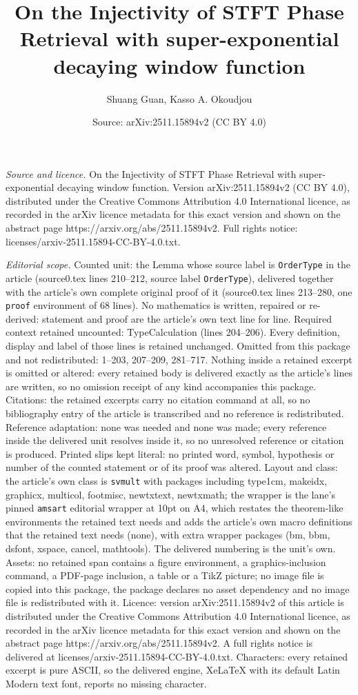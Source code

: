 \documentclass[10pt,a4paper]{amsart}
\title[On the Injectivity of STFT Phase Retrieval with super-expone]{On the Injectivity of STFT Phase Retrieval with super-exponential decaying window function}
\author{Shuang Guan, Kasso A. Okoudjou}
\date{Source: arXiv:2511.15894v2 (CC BY 4.0)}
\begin{document}
\maketitle

\noindent\emph{Source and licence.} On the Injectivity of STFT Phase Retrieval with super-exponential decaying window function. Version arXiv:2511.15894v2 (CC BY 4.0), distributed under the Creative Commons Attribution 4.0 International licence, as recorded in the arXiv licence metadata for this exact version and shown on the abstract page https://arxiv.org/abs/2511.15894v2. Full rights notice: licenses/arxiv-2511.15894-CC-BY-4.0.txt.\par\smallskip

\noindent\textit{Editorial scope.} Counted unit: the Lemma whose source label is \texttt{OrderType} in the article (source0.tex lines 210--212, source label \texttt{OrderType}), delivered together with the article's own complete original proof of it (source0.tex lines 213--280, one \texttt{proof} environment of 68 lines). No mathematics is written, repaired or re-derived: statement and proof are the article's own text line for line. Required context retained uncounted: TypeCalculation (lines 204--206). Every definition, display and label of those lines is retained unchanged. Omitted from this package and not redistributed: 1--203, 207--209, 281--717. Nothing inside a retained excerpt is omitted or altered: every retained body is delivered exactly as the article's lines are written, so no omission receipt of any kind accompanies this package. Citations: the retained excerpts carry no citation command at all, so no bibliography entry of the article is transcribed and no reference is redistributed. Reference adaptation: none was needed and none was made; every reference inside the delivered unit resolves inside it, so no unresolved reference or citation is produced. Printed slips kept literal: no printed word, symbol, hypothesis or number of the counted statement or of its proof was altered. Layout and class: the article's own class is \texttt{svmult} with packages including type1cm, makeidx, graphicx, multicol, footmisc, newtxtext, newtxmath; the wrapper is the lane's pinned \texttt{amsart} editorial wrapper at 10pt on A4, which restates the theorem-like environments the retained text needs and adds the article's own macro definitions that the retained text needs (none), with extra wrapper packages (bm, bbm, dsfont, xspace, cancel, mathtools). The delivered numbering is the unit's own. Assets: no retained span contains a figure environment, a graphics-inclusion command, a PDF-page inclusion, a table or a TikZ picture; no image file is copied into this package, the package declares no asset dependency and no image file is redistributed with it. Licence: version arXiv:2511.15894v2 of this article is distributed under the Creative Commons Attribution 4.0 International licence, as recorded in the arXiv licence metadata for this exact version and shown on the abstract page https://arxiv.org/abs/2511.15894v2. A full rights notice is delivered at licenses/arxiv-2511.15894-CC-BY-4.0.txt. Characters: every retained excerpt is pure ASCII, so the delivered engine, XeLaTeX with its default Latin Modern text font, reports no missing character.
\end{document}
